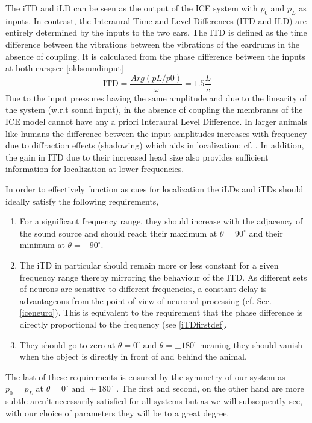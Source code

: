 The iTD and iLD can be seen as the output of the ICE system with $p_0$ and $p_L$ as inputs.
In contrast, the Interaural Time and Level Differences (ITD and ILD) are entirely determined 
by the inputs to the two ears. The ITD is defined as the time difference between the vibrations between the vibrations of
the eardrums in the absence of coupling. It is calculated from the phase difference between the inputs at both ears;see \eqref{oldsoundinput}
\begin{equation}
\mbox{ITD}=\frac{Arg(pL/p0)}{\omega}=1.5\frac{L}{c}
\end{equation}
Due to the 
input pressures having the same amplitude and due to the linearity of the system (w.r.t sound input), in the absence of coupling the membranes
of the ICE model cannot have any a priori Interaural Level Difference. In larger animals
like humans the difference between the input amplitudes increases with frequency due to 
diffraction effects (shadowing) which aids in localization; cf. \cite[p~.154]{fletcheracoustic}. In addition, the gain in ITD due
to their increased head size also provides sufficient information for localization at lower frequencies.

In order to effectively function as cues for localization the iLDs and iTDs should ideally satisfy the following requirements,
\begin{enumerate}
 \item \label{listitem1} For a significant frequency range, they should increase with the adjacency of the sound source and should reach their maximum at $\theta=90^\circ$ and
 their minimum at $\theta=-90^\circ$.
 \item \label{listitem2} The iTD in particular should remain more or less constant for a given frequency range thereby mirroring the behaviour
 of the ITD. As different sets of neurons are sensitive to different frequencies, a constant delay is advantageous from the point of view of neuronal processing
 (cf. Sec. \ref{iceneuro}). 
 This is equivalent to the requirement that the phase difference is
 directly proportional to the frequency (see \eqref{iTDfirstdef}.
  \item \label{listitem3} They should go to zero at $\theta=0^\circ \mbox{ and } \theta=\pm 180^\circ$ meaning they should vanish when the object is directly
 in front of and behind the animal.
\end{enumerate}
The last of these requirements is ensured by the symmetry of our system as $p_0=p_L$ at $\theta=0^\circ \mbox{ and } \pm 180^\circ$ .
The first and second, on the other hand are more subtle aren't necessarily satisfied for all systems but as we will subsequently see, with our choice of
parameters they will be to a great degree. 


